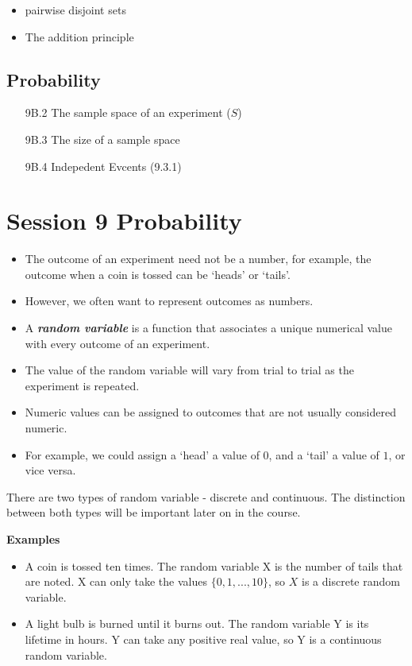 \documentclass[12pt]{report}
\begin{document}
\begin{itemize}
	\item pairwise disjoint sets
	\item The addition principle
\end{itemize}

\subsection*{Probability}
\begin{itemize}
	\item[9B.2] The sample space of an experiment ($S$)
	\item[9B.3] The size of a sample space
	\item[9B.4] Indepedent Evcents (9.3.1)
\end{itemize}
\section*{Session 9 Probability}
{ \Large
	\begin{itemize} \item The outcome of an experiment need not be a number, for example, the outcome when a coin is tossed can be `heads' or `tails'. \item
		However, we often want to represent outcomes as numbers. \item
		A \textbf{\emph{random variable}} is a function that associates a unique numerical value with every outcome of an experiment.
		\item The value of the random variable will vary from trial to trial as the experiment is repeated.
		\item Numeric values can be assigned to outcomes that are not usually considered numeric. \item For example, we could assign a `head' a value of $0$, and a `tail' a value of $1$, or vice versa.
	\end{itemize}
}
{ \Large
	There are two types of random variable - discrete and continuous. The distinction between both types will be important later on in the course.\\ \bigskip
	
	\textbf{Examples}
	\begin{itemize}
		\item A coin is tossed ten times. The random variable X is the number of tails that are noted.
		X can only take the values $\{0, 1, ..., 10\}$, so $X$ is a discrete random variable.
		\item A light bulb is burned until it burns out. The random variable Y is its lifetime in hours.
		Y can take any positive real value, so Y is a continuous random variable.
	\end{itemize}
}
\end{document}
